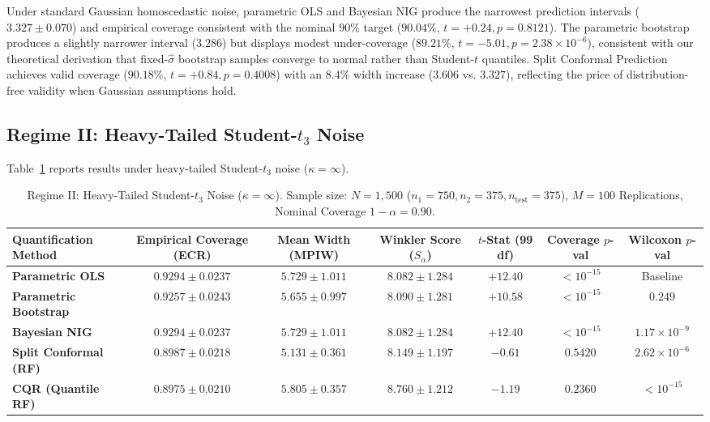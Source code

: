 \documentclass[journal]{IEEEtran}
\begin{document}
Under standard Gaussian homoscedastic noise, parametric OLS and Bayesian NIG produce the narrowest prediction intervals ($3.327 \pm 0.070$) and empirical coverage consistent with the nominal $90\%$ target ($90.04\%$, $t = +0.24, p = 0.8121$). The parametric bootstrap produces a slightly narrower interval ($3.286$) but displays modest under-coverage ($89.21\%$, $t = -5.01, p = 2.38 \times 10^{-6}$), consistent with our theoretical derivation that fixed-$\hat{\sigma}$ bootstrap samples converge to normal rather than Student-$t$ quantiles. Split Conformal Prediction achieves valid coverage ($90.18\%$, $t = +0.84, p = 0.4008$) with an $8.4\%$ width increase ($3.606$ vs. $3.327$), reflecting the price of distribution-free validity when Gaussian assumptions hold.

\subsection{Regime II: Heavy-Tailed Student-$t_3$ Noise}
Table~\ref{tab:regime2} reports results under heavy-tailed Student-$t_3$ noise ($\kappa = \infty$).

\begin{table}[!t]
\centering
\caption{Regime II: Heavy-Tailed Student-$t_3$ Noise ($\kappa = \infty$). Sample size: $N = 1,500$ ($n_1 = 750, n_2 = 375, n_{\text{test}} = 375$), $M = 100$ Replications, Nominal Coverage $1 - \alpha = 0.90$.}
\label{tab:regime2}
\begin{tabular}{lcccccc}
\toprule
\textbf{Quantification Method} & \textbf{Empirical Coverage (ECR)} & \textbf{Mean Width (MPIW)} & \textbf{Winkler Score ($S_\alpha$)} & \textbf{$t$-Stat (99 df)} & \textbf{Coverage $p$-val} & \textbf{Wilcoxon $p$-val} \\
\midrule
\textbf{Parametric OLS} & $0.9294 \pm 0.0237$ & $5.729 \pm 1.011$ & $8.082 \pm 1.284$ & $+12.40$ & $< 10^{-15}$ & Baseline \\
\textbf{Parametric Bootstrap} & $0.9257 \pm 0.0243$ & $5.655 \pm 0.997$ & $8.090 \pm 1.281$ & $+10.58$ & $< 10^{-15}$ & $0.249$ \\
\textbf{Bayesian NIG} & $0.9294 \pm 0.0237$ & $5.729 \pm 1.011$ & $8.082 \pm 1.284$ & $+12.40$ & $< 10^{-15}$ & $1.17 \times 10^{-9}$ \\
\textbf{Split Conformal (RF)} & $\mathbf{0.8987} \pm \mathbf{0.0218}$ & $\mathbf{5.131} \pm \mathbf{0.361}$ & $8.149 \pm 1.197$ & $-0.61$ & $0.5420$ & $2.62 \times 10^{-6}$ \\
\textbf{CQR (Quantile RF)} & $0.8975 \pm 0.0210$ & $5.805 \pm 0.357$ & $8.760 \pm 1.212$ & $-1.19$ & $0.2360$ & $< 10^{-15}$ \\
\bottomrule
\end{tabular}
\end{table}
\end{document}

